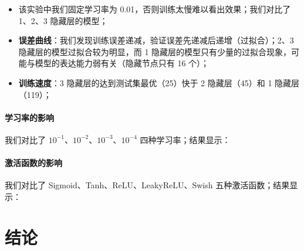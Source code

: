 \documentclass{ctexart}
\begin{document}
\begin{itemize}[noitemsep]

    \item 该实验中我们固定学习率为 0.01，否则训练太慢难以看出效果；我们对比了 1、2、3 隐藏层的模型；
    \item \textbf{误差曲线}：我们发现训练误差递减，验证误差先递减后递增（过拟合）；2、3 隐藏层的模型过拟合较为明显，而 1 隐藏层的模型只有少量的过拟合现象，可能与模型的表达能力弱有关（隐藏节点只有 16 个）；
    \item \textbf{训练速度}：3 隐藏层的达到测试集最优（25）快于 2 隐藏层（45）和 1 隐藏层（119）；

\end{itemize}

\paragraph{学习率的影响}

我们对比了 $10^{-1}$、$10^{-2}$、$10^{-3}$、$10^{-4}$ 四种学习率；结果显示：

\paragraph{激活函数的影响}

我们对比了 Sigmoid、Tanh、ReLU、LeakyReLU、Swish 五种激活函数；结果显示：

\section{结论} \label{sec:conclusion}
\end{document}
